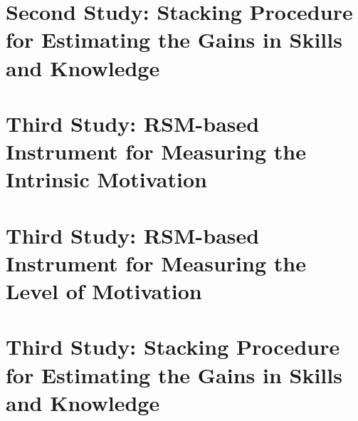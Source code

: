 \section{Second Study: Stacking Procedure for Estimating the Gains in Skills and Knowledge}
\label{sec:irt-learning-outcomes-second-study}

\section{Third Study: RSM-based Instrument for Measuring the Intrinsic Motivation}
\label{sec:irt-intrinsic-motivation-third-study}

\section{Third Study: RSM-based Instrument for Measuring the Level of Motivation}
\label{sec:irt-level-motivation-third-study}


\section{Third Study: Stacking Procedure for Estimating the Gains in Skills and Knowledge}
\label{sec:irt-learning-outcomes-third-study}
